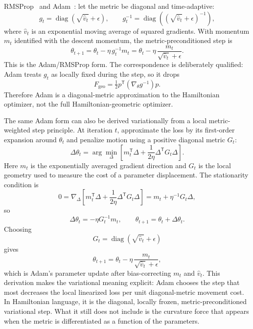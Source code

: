 \documentclass[10pt,twocolumn]{article}
\begin{document}
RMSProp~\cite{tieleman2012rmsprop} and Adam~\cite{kingma2015adam}: let the
metric be diagonal and time-adaptive:
\begin{equation}
g_t=\operatorname{diag}\left(\sqrt{\hat v_t}+\epsilon\right),
\qquad
g_t^{-1}=\operatorname{diag}\left((\sqrt{\hat v_t}+\epsilon)^{-1}\right),
\end{equation}
where $\hat v_t$ is an exponential moving average of squared gradients. With
momentum $m_t$ identified with the descent momentum, the metric-preconditioned
step is
\begin{equation}
\theta_{t+1}
  =\theta_t-\eta\,g_t^{-1}m_t
  =\theta_t-\eta\,\frac{m_t}{\sqrt{\hat v_t}+\epsilon}.
\end{equation}
This is the Adam/RMSProp form. The correspondence is deliberately qualified:
Adam treats $g_t$ as locally fixed during the step, so it drops
\begin{equation}
F_{\mathrm{geo}}
  =\tfrac12 p^{\mathsf T}(\nabla_\theta g^{-1})p.
\end{equation}
Therefore Adam is a diagonal-metric approximation to the Hamiltonian optimizer,
not the full Hamiltonian-geometric optimizer.

The same Adam form can also be derived variationally from a local
metric-weighted step principle. At iteration $t$, approximate the loss by its
first-order expansion around $\theta_t$ and penalize motion using a positive
diagonal metric $G_t$:
\begin{equation}
\Delta\theta_t
  = \arg\min_{\Delta}
  \left[
    m_t^{\mathsf T}\Delta
    + \frac{1}{2\eta}\Delta^{\mathsf T}G_t\Delta
  \right].
\label{eq:adam-variational-objective}
\end{equation}
Here $m_t$ is the exponentially averaged gradient direction and $G_t$ is the
local geometry used to measure the cost of a parameter displacement. The
stationarity condition is
\begin{equation}
0=\nabla_\Delta\left[
    m_t^{\mathsf T}\Delta
    + \frac{1}{2\eta}\Delta^{\mathsf T}G_t\Delta
  \right]
  =m_t+\eta^{-1}G_t\Delta,
\end{equation}
so
\begin{equation}
\Delta\theta_t=-\eta G_t^{-1}m_t,
\qquad
\theta_{t+1}=\theta_t+\Delta\theta_t.
\end{equation}
Choosing
\begin{equation}
G_t=\operatorname{diag}\left(\sqrt{\hat v_t}+\epsilon\right)
\end{equation}
gives
\begin{equation}
\theta_{t+1}
  = \theta_t-\eta\,\frac{m_t}{\sqrt{\hat v_t}+\epsilon},
\end{equation}
which is Adam's parameter update after bias-correcting $m_t$ and $\hat v_t$.
This derivation makes the variational meaning explicit: Adam chooses the step
that most decreases the local linearized loss per unit diagonal-metric
movement cost. In Hamiltonian language, it is the diagonal, locally frozen,
metric-preconditioned variational step. What it still does not include is the
curvature force that appears when the metric is differentiated as a function of
the parameters.
\end{document}
